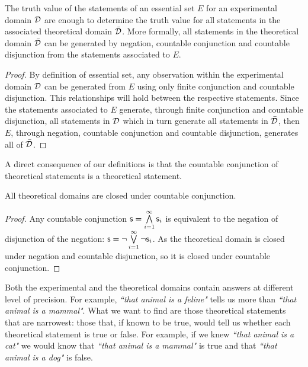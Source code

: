 \documentclass[11pt,letterpaper,fleqn]{memoir} %
\begin{document}
\begin{mathSection}
\begin{prop}
	The truth value of the statements of an essential set $E$ for an experimental domain $\mathcal{D}$ are enough to determine the truth value for all statements in the associated theoretical domain $\bar{\mathcal{D}}$. More formally, all statements in the theoretical domain $\bar{\mathcal{D}}$ can be generated by negation, countable conjunction and countable disjunction from the statements associated to $E$.
\end{prop}

\begin{proof}
	By definition of essential set, any observation within the experimental domain $\mathcal{D}$ can be generated from $E$ using only finite conjunction and countable disjunction. This relationships will hold between the respective statements. Since the statements associated to $E$ generate, through finite conjunction and countable disjunction, all statements in $\mathcal{D}$ which in turn generate all statements in $\bar{\mathcal{D}}$, then $E$, through negation, countable conjunction and countable disjunction, generates all of $\bar{\mathcal{D}}$.
\end{proof}
\end{mathSection}

A direct consequence of our definitions is that the countable conjunction of theoretical statements is a theoretical statement.

\begin{mathSection}
	\begin{prop}
		All theoretical domains are closed under countable conjunction.
	\end{prop}

\begin{proof}
	Any countable conjunction $\mathsf{s} = \bigwedge\limits_{i=1}^{\infty} \mathsf{s}_i$ is equivalent to the negation of disjunction of the negation: $\mathsf{s} = \neg\bigvee\limits_{i=1}^{\infty} \neg\mathsf{s}_i$. As the theoretical domain is closed under negation and countable disjunction, so it is closed under countable conjunction.  
\end{proof}

\end{mathSection}

Both the experimental and the theoretical domains contain answers at different level of precision. For example, \emph{``that animal is a feline"} tells us more than \emph{``that animal is a mammal"}. What we want to find are those theoretical statements that are narrowest: those that, if known to be true, would tell us whether each theoretical statement is true or false. For example, if we knew \emph{``that animal is a cat"} we would know that \emph{``that animal is a mammal"} is true and that \emph{``that animal is a dog"} is false.
\end{document}
